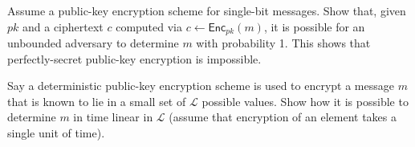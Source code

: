 \documentclass[12pt,letterpaper,boxed]{amspset}
\begin{document}
\begin{problem}[10.1]
Assume a public-key encryption scheme for single-bit messages. Show that, given $pk$ and a ciphertext $c$ computed via $c \gets \mathsf{Enc}_{pk}(m)$, it is possible for an unbounded adversary to determine $m$ with probability 1. This shows that perfectly-secret public-key encryption is impossible.
\end{problem}

\begin{solution}
\vspace{3cm}

\end{solution}

\begin{problem}[10.2]
Say a deterministic public-key encryption scheme is used to encrypt a message $m$ that is known to lie in a small set of $\mathcal{L}$ possible values. Show how it is possible to determine $m$ in time linear in $\mathcal{L}$ (assume that encryption of an element takes a single unit of time).
\end{problem}

\begin{solution}
\vspace{3cm}

\end{solution}




\end{document}

